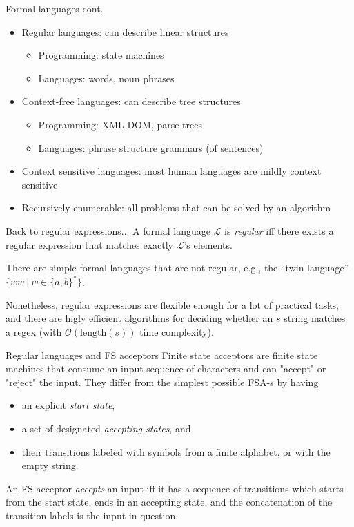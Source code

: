 \documentclass[style=upen, size=14pt]{powerdot}
\newcommand{\gold}{\color{arany}}
\theoremstyle{definition}
\begin{document}
\begin{slide}[toc=]{Formal languages cont.}
  \begin{itemize}
    \item Regular languages: can describe linear structures
      \begin{itemize}
        \item Programming: state machines
        \item Languages: words, noun phrases
      \end{itemize}
    \item Context-free languages: can describe tree structures
      \begin{itemize}
        \item Programming: XML DOM, parse trees
        \item Languages: phrase structure grammars (of sentences)
      \end{itemize}
    \item Context sensitive languages: most human languages are mildly context
      sensitive
    \item Recursively enumerable: all problems that can be solved by an
      algorithm
  \end{itemize}
\end{slide}

\begin{slide}[toc=]{Back to regular expressions...}
  A formal language $\mathcal L$ is \emph{\gold regular} iff there exists a
  regular expression that matches exactly $\mathcal L$'s elements.\bigskip

  There are simple formal languages that are not regular, e.g., the ``twin
  language'' $\{ww ~\vert~ w \in \{a, b\}^* \}$.\bigskip

  Nonetheless, regular expressions are flexible enough for a lot of practical
  tasks, and there are higly efficient algorithms for deciding whether an $s$
  string matches a regex (with $\mathcal O(\mathrm{length}(s))$ time
  complexity).
\end{slide}

\begin{slide}[toc=]{Regular languages and FS acceptors}
  Finite state acceptors are finite state machines that consume an input
  sequence of characters and can "accept" or "reject" the input. They differ
  from the simplest possible FSA-s by having
  \begin{itemize}
  \item an explicit \emph{\gold start state},
  \item a set of designated \emph{\gold accepting states}, and
  \item their transitions labeled with symbols from a finite alphabet, or with
    the empty string.
  \end{itemize}
  An FS acceptor \emph{\gold accepts} an input iff it has a sequence of
  transitions which starts from the start state, ends in an accepting state, and
  the concatenation of the transition labels is the input in question.
\end{slide}
\end{document}
